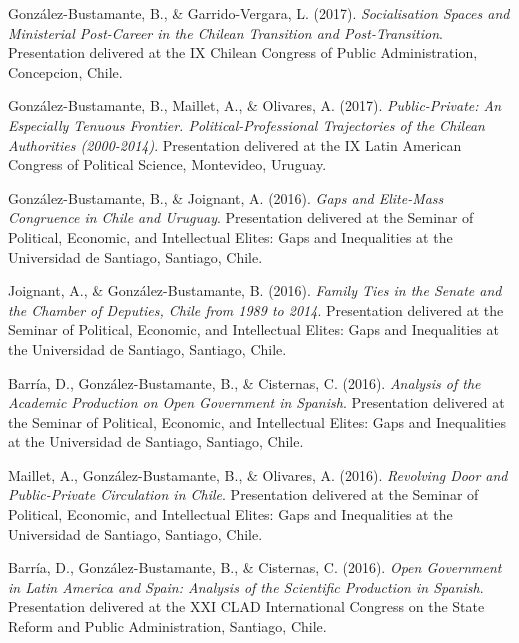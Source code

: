 \begin{publications}
\begin{benumerate}{77}
\item{\small González-Bustamante, B., \& Garrido-Vergara, L. (2017). {\itshape Socialisation Spaces and Ministerial Post-Career in the Chilean Transition and Post-Transition}. Presentation delivered at the IX Chilean Congress of Public Administration, Concepcion, Chile.}\vspace{1mm}

\item{\small González-Bustamante, B., Maillet, A., \& Olivares, A. (2017). {\itshape Public-Private: An Especially Tenuous Frontier. Political-Professional Trajectories of the Chilean Authorities (2000-2014)}. Presentation delivered at the IX Latin American Congress of Political Science, Montevideo, Uruguay.}\vspace{1mm}

\item{\small González-Bustamante, B., \& Joignant, A. (2016). {\itshape Gaps and Elite-Mass Congruence in Chile and Uruguay}. Presentation delivered at the Seminar of Political, Economic, and Intellectual Elites: Gaps and Inequalities at the Universidad de Santiago, Santiago, Chile.}\vspace{1mm}

\item{\small Joignant, A., \& González-Bustamante, B. (2016). {\itshape Family Ties in the Senate and the Chamber of Deputies, Chile from 1989 to 2014}. Presentation delivered at the Seminar of Political, Economic, and Intellectual Elites: Gaps and Inequalities at the Universidad de Santiago, Santiago, Chile.}\vspace{1mm}

\item{\small Barría, D., González-Bustamante, B., \& Cisternas, C. (2016). {\itshape Analysis of the Academic Production on Open Government in Spanish}. Presentation delivered at the Seminar of Political, Economic, and Intellectual Elites: Gaps and Inequalities at the Universidad de Santiago, Santiago, Chile.}\vspace{1mm}

\item{\small Maillet, A., González-Bustamante, B., \& Olivares, A. (2016). {\itshape Revolving Door and Public-Private Circulation in Chile}. Presentation delivered at the Seminar of Political, Economic, and Intellectual Elites: Gaps and Inequalities at the Universidad de Santiago, Santiago, Chile.}\vspace{1mm}

\item{\small Barría, D., González-Bustamante, B., \& Cisternas, C. (2016). {\itshape Open Government in Latin America and Spain: Analysis of the Scientific Production in Spanish}. Presentation delivered at the XXI CLAD International Congress on the State Reform and Public Administration, Santiago, Chile.}\vspace{1mm}


\end{benumerate}
\end{publications}
